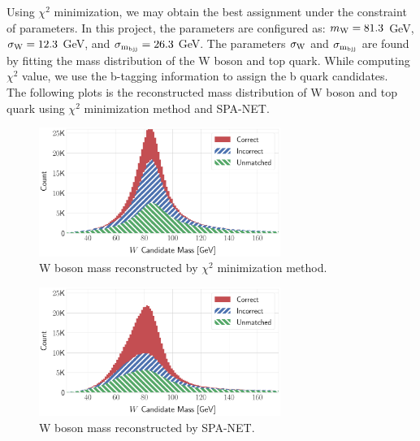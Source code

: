 Using $\chi^{2}$ minimization, we may obtain the best assignment under the constraint of parameters. In this project, the parameters are configured as: $m_{\rm W}=81.3$ GeV, $\sigma_{\rm W} = 12.3$ GeV, and $\sigma_{\rm m_{bjj}}=26.3$ GeV. The parameters $\sigma_{\rm W}$ and $\sigma_{\rm m_{bjj}}$ are found by fitting the mass distribution of the W boson and top quark. While computing $\chi^{2}$ value, we use the b-tagging information to assign the b quark candidates. 
\\
The following plots is the reconstructed mass distribution of W boson and top quark using $\chi^{2}$ minimization method and SPA-NET.
\\
\begin{figure}[H]
	\centering
	\includegraphics[width=0.7\textwidth]{Figures/network_w_quark_stacked_chi2.pdf}
	\caption{W boson mass reconstructed by $\chi^{2}$ minimization method.}
	\label{fig: chi2 reco Wboson}
\end{figure}
\begin{figure}[H]
	\centering
	\includegraphics[width=0.7\textwidth]{Figures/network_w_quark_stacked.pdf}
	\caption{W boson mass reconstructed by SPA-NET.}
	\label{fig: spanet reco Wboson}
\end{figure}

